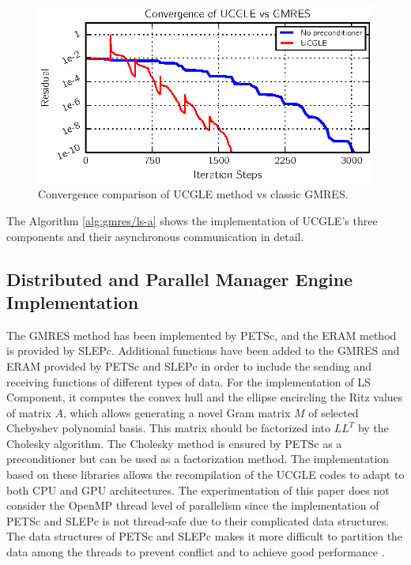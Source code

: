\begin{figure}[htbp]
	\centering
	\includegraphics[width=6.2in]{fig/conv.eps}
	\caption{Convergence comparison of UCGLE method vs classic GMRES.}
	\label{fig:conv}
\end{figure}

The Algorithm \ref{alg:gmres/ls-a} shows the implementation of UCGLE's three components and their asynchronous communication in detail. 

\subsection{Distributed and Parallel Manager Engine Implementation}\label{Distributed and Parallel Manager Engine Implementation}

The GMRES method has been implemented by PETSc, and the ERAM method is provided by SLEPc. Additional functions have been added to the GMRES and ERAM provided by PETSc and SLEPc in order to include the sending and receiving functions of different types of data. For the implementation of LS Component, it computes the convex hull and the ellipse encircling the Ritz values of matrix $A$, which allows generating a novel Gram matrix $M$ of selected Chebyshev polynomial basis. This matrix should be factorized into $LL^T$ by the Cholesky algorithm. The Cholesky method is ensured by PETSc as a preconditioner but can be used as a factorization method. The implementation based on these libraries allows the recompilation of the UCGLE codes to adapt to both CPU and GPU architectures. The experimentation of this paper does not consider the OpenMP thread level of parallelism since the implementation of PETSc and SLEPc is not thread-safe due to their complicated data structures. The data structures of PETSc and SLEPc makes it more difficult to partition the data among the threads to prevent conflict and to achieve good performance \cite{petsc-user-ref}.

